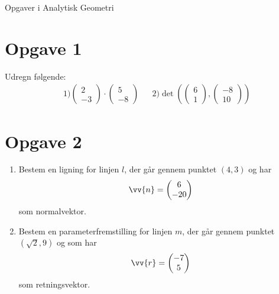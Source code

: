 \begin{center}
\Huge
Opgaver i Analytisk Geometri
\end{center}

\section*{Opgave 1}
Udregn følgende:
\begin{align*}
	&1) 
	\begin{pmatrix}
		2 \\ -3		
	\end{pmatrix} \cdot 
	\begin{pmatrix}
		5 \\- 8
	\end{pmatrix}	
	&&2)  
	\det \left(\begin{pmatrix}
		6 \\ 1		
	\end{pmatrix},
	\begin{pmatrix}
		-8 \\ 10
	\end{pmatrix}
	 \right)
\end{align*}
\section*{Opgave 2}
\begin{enumerate}[label=\roman*)]
	\item Bestem en ligning for linjen $l$, der går gennem punktet $(4,3)$ og har 
	\begin{align*}
		\vv{n} = 
		\begin{pmatrix}
			6 \\ -20
		\end{pmatrix}
	\end{align*}
	som normalvektor.
	\item 
	Bestem en parameterfremstilling for linjen $m$, der går gennem punktet $(\sqrt{2},9)$ og som har
	\begin{align*}
		\vv{r} = 
		\begin{pmatrix}
			-7 \\ 5
		\end{pmatrix}
	\end{align*}
	som retningsvektor.
\end{enumerate}

